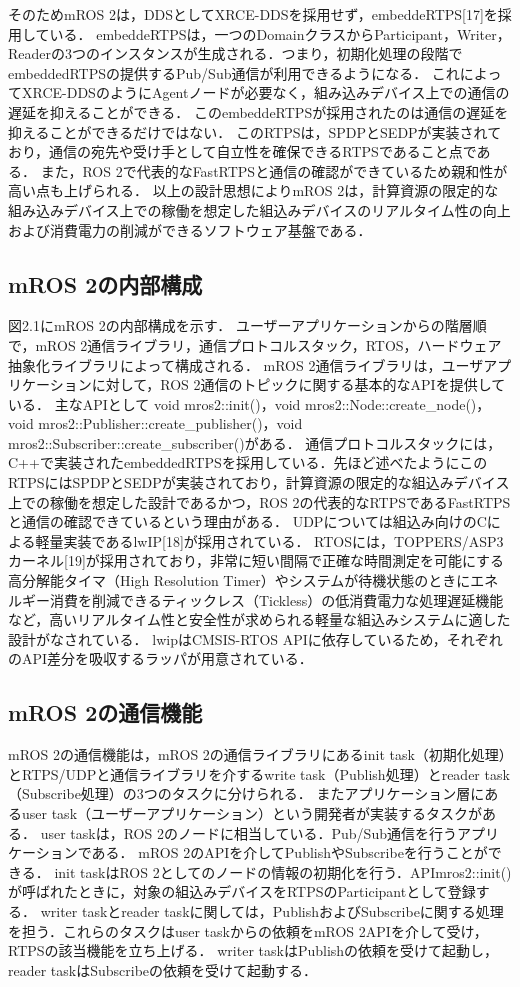 そのためmROS 2は，DDSとしてXRCE-DDSを採用せず，embeddeRTPS[17]を採用している．
embeddeRTPSは，一つのDomainクラスからParticipant，Writer，Readerの3つのインスタンスが生成される．つまり，初期化処理の段階でembeddedRTPSの提供するPub/Sub通信が利用できるようになる．
これによってXRCE-DDSのようにAgentノードが必要なく，組み込みデバイス上での通信の遅延を抑えることができる．
このembeddeRTPSが採用されたのは通信の遅延を抑えることができるだけではない．
このRTPSは，SPDPとSEDPが実装されており，通信の宛先や受け手として自立性を確保できるRTPSであること点である．
また，ROS 2で代表的なFastRTPSと通信の確認ができているため親和性が高い点も上げられる．
以上の設計思想によりmROS 2は，計算資源の限定的な組み込みデバイス上での稼働を想定した組込みデバイスのリアルタイム性の向上および消費電力の削減ができるソフトウェア基盤である．
\subsection{mROS 2の内部構成}
図2.1にmROS 2の内部構成を示す．
ユーザーアプリケーションからの階層順で，mROS 2通信ライブラリ，通信プロトコルスタック，RTOS，ハードウェア抽象化ライブラリによって構成される．
mROS 2通信ライブラリは，ユーザアプリケーションに対して，ROS 2通信のトピックに関する基本的なAPIを提供している．
主なAPIとして void mros2::init()，void mros2::Node::create\_node()，void mros2::Publisher::create\_publisher()，void mros2::Subscriber::create\_subscriber()がある．
通信プロトコルスタックには，C++で実装されたembeddedRTPSを採用している．先ほど述べたようにこのRTPSにはSPDPとSEDPが実装されており，計算資源の限定的な組込みデバイス上での稼働を想定した設計であるかつ，ROS 2の代表的なRTPSであるFastRTPSと通信の確認できているという理由がある．
UDPについては組込み向けのCによる軽量実装であるlwIP[18]が採用されている．
RTOSには，TOPPERS/ASP3カーネル[19]が採用されており，非常に短い間隔で正確な時間測定を可能にする高分解能タイマ（High Resolution Timer）やシステムが待機状態のときにエネルギー消費を削減できるティックレス（Tickless）の低消費電力な処理遅延機能など，高いリアルタイム性と安全性が求められる軽量な組込みシステムに適した設計がなされている．
lwipはCMSIS-RTOS APIに依存しているため，それぞれのAPI差分を吸収するラッパが用意されている．
\subsection{mROS 2の通信機能}
mROS 2の通信機能は，mROS 2の通信ライブラリにあるinit task（初期化処理）とRTPS/UDPと通信ライブラリを介するwrite task（Publish処理）とreader task（Subscribe処理）の3つのタスクに分けられる．
またアプリケーション層にあるuser task（ユーザーアプリケーション）という開発者が実装するタスクがある．
user taskは，ROS 2のノードに相当している．Pub/Sub通信を行うアプリケーションである．
mROS 2のAPIを介してPublishやSubscribeを行うことができる．
init taskはROS 2としてのノードの情報の初期化を行う．APImros2::init()が呼ばれたときに，対象の組込みデバイスをRTPSのParticipantとして登録する．
writer taskとreader taskに関しては，PublishおよびSubscribeに関する処理を担う．これらのタスクはuser taskからの依頼をmROS 2APIを介して受け，RTPSの該当機能を立ち上げる．
writer taskはPublishの依頼を受けて起動し，reader taskはSubscribeの依頼を受けて起動する．
